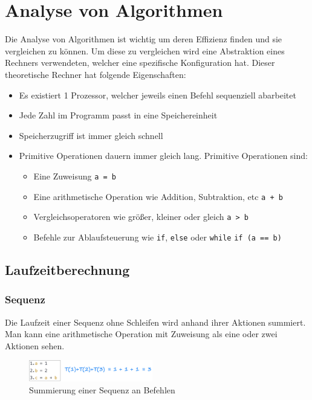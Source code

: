 \documentclass{article}
\begin{document}
	\section{Analyse von Algorithmen}
	Die Analyse von Algorithmen ist wichtig um deren Effizienz finden und sie vergleichen zu können. Um diese zu vergleichen wird eine Abstraktion eines Rechners verwendeten, welcher eine spezifische Konfiguration hat. Dieser theoretische Rechner hat folgende Eigenschaften:
	\begin{itemize}
		\item{Es existiert 1 Prozessor, welcher jeweils einen Befehl sequenziell abarbeitet}
		\item{Jede Zahl im Programm passt in eine Speichereinheit}
		\item{Speicherzugriff ist immer gleich schnell}
		\item{Primitive Operationen dauern immer gleich lang. Primitive Operationen sind:}
		\begin{itemize}
			\item{Eine Zuweisung \texttt{a = b}}
			\item{Eine arithmetische Operation wie Addition, Subtraktion, etc \texttt{a + b}}
			\item{Vergleichsoperatoren wie größer, kleiner oder gleich \texttt{a > b}}
			\item{Befehle zur Ablaufsteuerung wie \texttt{if}, \texttt{else} oder \texttt{while} \texttt{if (a == b)}}
		\end{itemize}
	\end{itemize}
	\subsection{Laufzeitberechnung}
	\subsubsection{Sequenz}
	Die Laufzeit einer Sequenz ohne Schleifen wird anhand ihrer Aktionen summiert. Man kann eine arithmetische Operation mit Zuweisung als eine oder zwei Aktionen sehen.
	\begin{figure}[H]
	\centering
	\includegraphics[width=0.48\textwidth]{Bilder/sequence.png}
	\caption{Summierung einer Sequenz an Befehlen}
	\end{figure}
\end{document}
